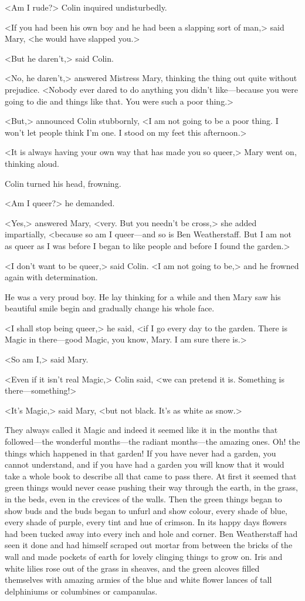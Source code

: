 <Am I rude?> Colin inquired undisturbedly.

<If you had been his own boy and he had been a slapping sort of man,> said Mary, <he would have slapped you.>

<But he daren't,> said Colin.

<No, he daren't,> answered Mistress Mary, thinking the thing out quite without prejudice. <Nobody ever dared to do anything you didn't like—because you were going to die and things like that. You were such a poor thing.>

<But,> announced Colin stubbornly, <I am not going to be a poor thing. I won't let people think I'm one. I stood on my feet this afternoon.>

<It is always having your own way that has made you so queer,> Mary went on, thinking aloud.

Colin turned his head, frowning.

<Am I queer?> he demanded.

<Yes,> answered Mary, <very. But you needn't be cross,> she added impartially, <because so am I queer—and so is Ben Weatherstaff. But I am not as queer as I was before I began to like people and before I found the garden.>

<I don't want to be queer,> said Colin. <I am not going to be,> and he frowned again with determination.

He was a very proud boy. He lay thinking for a while and then Mary saw his beautiful smile begin and gradually change his whole face.

<I shall stop being queer,> he said, <if I go every day to the garden. There is Magic in there—good Magic, you know, Mary. I am sure there is.>

<So am I,> said Mary.

<Even if it isn't real Magic,> Colin said, <we can pretend it is. Something is there—something!>

<It's Magic,> said Mary, <but not black. It's as white as snow.>

They always called it Magic and indeed it seemed like it in the months that followed—the wonderful months—the radiant months—the amazing ones. Oh! the things which happened in that garden! If you have never had a garden, you cannot understand, and if you have had a garden you will know that it would take a whole book to describe all that came to pass there. At first it seemed that green things would never cease pushing their way through the earth, in the grass, in the beds, even in the crevices of the walls. Then the green things began to show buds and the buds began to unfurl and show colour, every shade of blue, every shade of purple, every tint and hue of crimson. In its happy days flowers had been tucked away into every inch and hole and corner. Ben Weatherstaff had seen it done and had himself scraped out mortar from between the bricks of the wall and made pockets of earth for lovely clinging things to grow on. Iris and white lilies rose out of the grass in sheaves, and the green alcoves filled themselves with amazing armies of the blue and white flower lances of tall delphiniums or columbines or campanulas.

